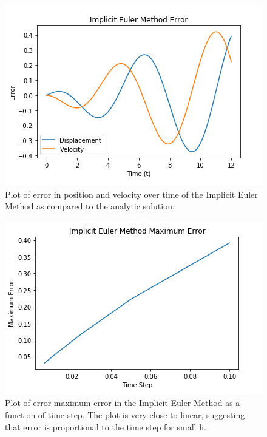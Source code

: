 \documentclass{article}
\begin{document}
\begin{figure}[h!]
\centering
\includegraphics[scale=0.35]{imp_euler_err.png}
\caption{Plot of error in position and velocity over time of the Implicit Euler Method as compared to the analytic solution.}
\label{fig:impeulererr}
\end{figure}

\begin{figure}[h!]
\centering
\includegraphics[scale=0.35]{imp_euler_max_err.png}
\caption{Plot of error maximum error in the Implicit Euler Method as a function of time step. The plot is very close to linear, suggesting that error is proportional to the time step for small h.}
\label{fig:impeulermaxerr}
\end{figure}
\end{document}
